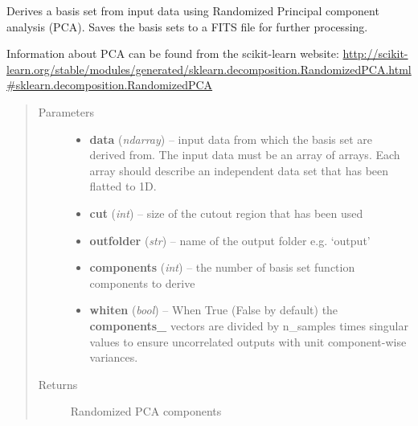 \documentclass[a4paper,12pt,english]{sphinxmanual}
\begin{document}

\begin{fulllineitems}
\label{analysis:analysis.PSFbasisSets.deriveBasisSetsRandomizedPCA}
Derives a basis set from input data using Randomized Principal component analysis (PCA).
Saves the basis sets to a FITS file for further processing.

Information about PCA can be found from the scikit-learn website:
\href{http://scikit-learn.org/stable/modules/generated/sklearn.decomposition.RandomizedPCA.html\#sklearn.decomposition.RandomizedPCA}{http://scikit-learn.org/stable/modules/generated/sklearn.decomposition.RandomizedPCA.html\#sklearn.decomposition.RandomizedPCA}
\begin{quote}\begin{description}
\item[{Parameters}] \leavevmode\begin{itemize}
\item {} 
\textbf{data} (\emph{ndarray}) -- input data from which the basis set are derived from. The input data must be an array of arrays.
Each array should describe an independent data set that has been flatted to 1D.

\item {} 
\textbf{cut} (\emph{int}) -- size of the cutout region that has been used

\item {} 
\textbf{outfolder} (\emph{str}) -- name of the output folder e.g. `output'

\item {} 
\textbf{components} (\emph{int}) -- the number of basis set function components to derive

\item {} 
\textbf{whiten} (\emph{bool}) -- When True (False by default) the {\color{red}\bfseries{}components\_} vectors are divided by n\_samples times
singular values to ensure uncorrelated outputs with unit component-wise variances.

\end{itemize}

\item[{Returns}] \leavevmode
Randomized PCA components

\end{description}\end{quote}

\end{fulllineitems}
\end{document}
